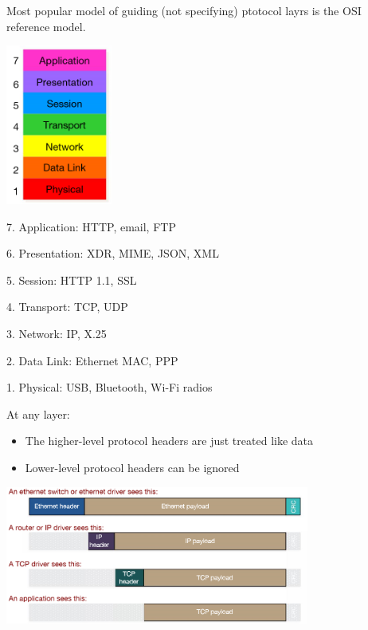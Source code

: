 \begin{slide}

	
	Most popular model of guiding (not specifying) ptotocol layrs is the OSI reference model.
	\medskip
	
	\begin{minipage}{0.3\textwidth}
	\includegraphics[width=35mm]{OSI-model.png}
	\end{minipage}
	\hfill
	\begin{minipage}{0.68\textwidth}
		7. Application: HTTP, email, FTP
		\medskip
		\smallskip
		
		6. Presentation: XDR, MIME, JSON, XML
		\medskip
		\smallskip
		
		5. Session: HTTP 1.1, SSL
		\medskip
		\smallskip
		
		4. Transport: TCP, UDP
		\medskip
		\smallskip
		
		3. Network: IP, X.25
		\medskip
		\smallskip
		
		2. Data Link: Ethernet MAC, PPP
		\medskip
		\smallskip
		
		1. Physical: USB, Bluetooth, Wi-Fi radios
	\end{minipage}

\end{slide}

\begin{slide}

	
	At any layer:
	\begin{itemize}
		\item The higher-level protocol headers are just treated like data
		\item Lower-level protocol headers can be ignored
	\end{itemize}
	
	\includegraphics[width=100mm]{protocol-encapsulation.png}
	
\end{slide}

